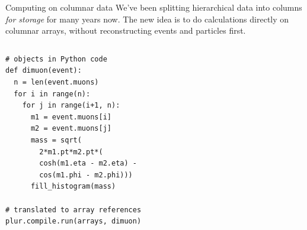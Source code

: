\documentclass{beamer}
\begin{document}
\begin{frame}[fragile]{Computing on columnar data}
\vspace{0.5 cm}
We've been splitting hierarchical data into columns {\it for storage} for many years now. The new idea is to do calculations directly on columnar arrays, without reconstructing events and particles first.

\vspace{0.35 cm}
\begin{columns}[b]
\scriptsize
\begin{verbatim}
# objects in Python code
def dimuon(event):
  n = len(event.muons)
  for i in range(n):
    for j in range(i+1, n):
      m1 = event.muons[i]
      m2 = event.muons[j]
      mass = sqrt(
        2*m1.pt*m2.pt*(
        cosh(m1.eta - m2.eta) -
        cos(m1.phi - m2.phi)))
      fill_histogram(mass)

# translated to array references
plur.compile.run(arrays, dimuon)
\end{verbatim}


\end{columns}
\end{frame}
\end{document}
